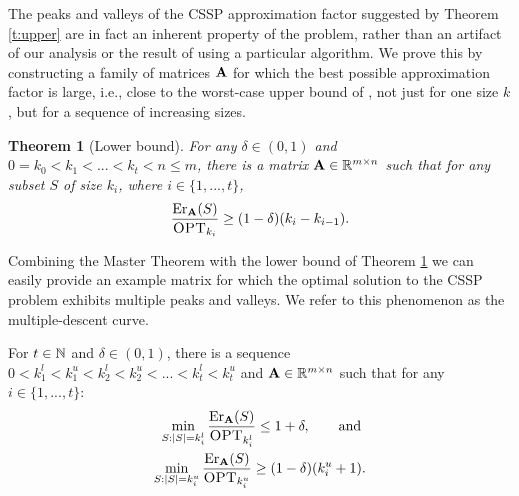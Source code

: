 \documentclass{article}
\newtheorem{theorem}{Theorem}
\begin{document}
The peaks and valleys of the CSSP approximation
factor suggested by Theorem \ref{t:upper} are in fact an
inherent property of the problem, rather than an artifact of our
analysis or the result of using a particular algorithm. We prove this by
constructing a family of matrices $\mathbf A$ for which the best possible approximation
factor is large, i.e., close to the worst-case upper bound of
\citet{pca-volume-sampling}, not just for one size $k$, but for a
sequence of increasing sizes.
 \begin{theorem}[Lower bound]\label{t:lower}
For any $\delta\in(0,1)$ and
$0\!=\!k_0\!<\!k_1\!<\!...\!<\!k_t\!<\!n\leq m$, there is a matrix 
$\mathbf A\in\mathbb R^{m\times n}$ such that for any subset $S$ of size $k_i$,
where $i\in\{1,...,t\}$,
\begin{align*}
\frac{\mathrm{Er}_{\mathbf A}(S)}{\textsc{OPT}_{k_i}}\geq (1-\delta)(k_i-k_{i-1}).
  \end{align*}
\end{theorem}
Combining the Master Theorem with the lower
bound of Theorem \ref{t:lower} we can easily provide an example matrix
for which the optimal solution to the CSSP problem exhibits multiple
peaks and valleys. We refer to this phenomenon as the multiple-descent curve.
\begin{corollary}\label{c:multiple-descent}
  For $t\in\mathbb N$ and $\delta\in(0,1)$, there is a
  sequence $0<k_1^l<k_1^u<k_2^l<k_2^u<...<k_t^l<k_t^u$ and
  $\mathbf A\in\mathbb R^{m\times n}$ such that for any $i\in\{1,...,t\}$:
  \begin{align*}
    \min_{S:|S|=k_i^l}\frac{\mathrm{Er}_\mathbf A(S)}{\textsc{OPT}_{k_i^l}}\leq 1+\delta,
                                 \qquad\text{and } \\
    \min_{S:|S|=k_i^u}\frac{\mathrm{Er}_\mathbf A(S)}{\textsc{OPT}_{k_i^u}} \geq
    (1-\delta)(k_i^u+1).
  \end{align*}
\end{corollary}
\end{document}
